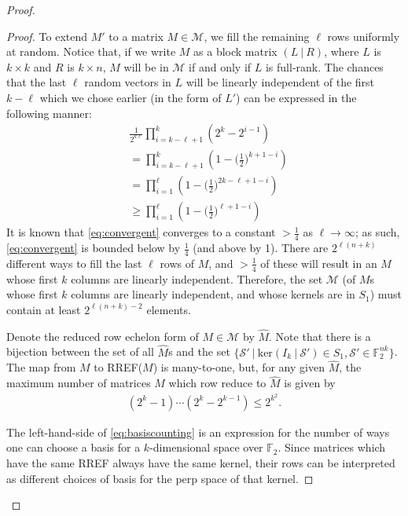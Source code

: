 \documentclass{article}
\begin{document}
\begin{proof}
\begin{itemize}
\begin{proof}
To extend $M'$ to a matrix $M \in \mathcal{M}$, we fill the remaining $\ell$ rows uniformly at random. Notice that, if we write $M$ as a block matrix $(L \:|\: R)$, where $L$ is $k \times k$ and $R$ is $k \times n$, $M$ will be in $\mathcal{M}$ if and only if $L$ is full-rank. The chances that the last $\ell$ random vectors in $L$ will be linearly independent of the first $k - \ell$ which we chose earlier (in the form of $L'$) can be expressed in the following manner:
\begin{align}
&\frac{1}{2^{k\ell}} \prod_{i = k - \ell + 1}^k (2^k - 2^{i-1}) \\
&= \prod_{i = k - \ell + 1}^k (1 - \big(\frac{1}{2}\big)^{k+1-i}) \\
&= \prod_{i = 1}^\ell (1 - \big(\frac{1}{2}\big)^{2k-\ell+1-i}) \\
&\geq \prod_{i = 1}^\ell (1 - \big(\frac{1}{2}\big)^{\ell+1-i}) \label{eq:convergent}
\end{align}
It is known that \cref{eq:convergent} converges to a constant $> \frac{1}{4}$ as $\ell \rightarrow \infty$; as such, \cref{eq:convergent} is bounded below by $\frac{1}{4}$ (and above by 1). There are $2^{\ell(n+k)}$ different ways to fill the last $\ell$ rows of $M$, and $> \frac{1}{4}$ of these will result in an $M$ whose first $k$ columns are linearly independent. Therefore, the set $\mathcal{M}$ (of $M$s whose first $k$ columns are linearly independent, and whose kernels are in $S_1$) must contain at least $2^{\ell(n+k) - 2}$ elements.

Denote the reduced row echelon form of $M \in \mathcal{M}$ by $\hat M$. Note that there is a bijection between the set of all $\hat M$s and the set $\big\{ \mathcal{S}' \:\big|\: \mathrm{ker}(I_k \:|\: \mathcal{S}') \in S_1, \mathcal{S}' \in \mathbb{F}_2^{nk} \big\}$. The map from $M$ to RREF($M$) is many-to-one, but, for any given $\hat M$, the maximum number of matrices $M$ which row reduce to $\hat M$ is given by
\begin{align}
	(2^k - 1)\cdots(2^k - 2^{k-1}) \leq 2^{k^2}. \label{eq:basiscounting}
\end{align}

The left-hand-side of \cref{eq:basiscounting} is an expression for the number of ways one can choose a basis for a $k$-dimensional space over $\mathbb{F}_2$. Since matrices which have the same RREF always have the same kernel, their rows can be interpreted as different choices of basis for the perp space of that kernel.


\end{proof}
\end{itemize}
\end{proof}
\end{document}
